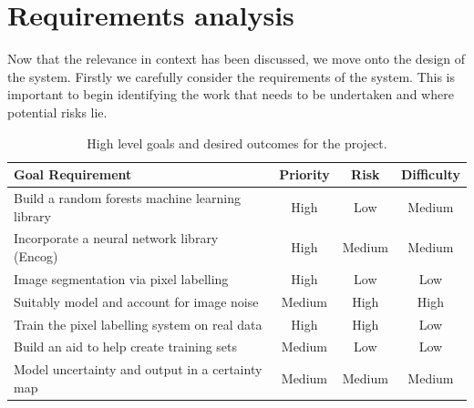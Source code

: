 \documentclass[12pt,twoside,notitlepage]{report}
\begin{document}
        








    \section{Requirements analysis}
        Now that the relevance in context has been discussed, we move onto the design of the system. Firstly we carefully consider 
        the requirements of the system. This is important to begin identifying the work that needs to be undertaken 
        and where potential risks lie. 

        \begin{table}[H]
            \begin{minipage}{\textwidth}
                \begin{tabular}{lccc}
                    \hline 
                        \textbf{Goal Requirement} & \textbf{Priority} & \textbf{Risk} & \textbf{Difficulty} \\
                    \hline 
                        Build a random forests machine learning library       & High      & Low         & Medium    \\
                        Incorporate a neural network library (Encog)          & High      & Medium      & Medium    \\
                        Image segmentation via pixel labelling                & High      & Low         & Low       \\
                        Suitably model and account for image noise            & Medium    & High        & High      \\ 
                        Train the pixel labelling system on real data         & High      & High        & Low       \\
                        Build an aid to help create training sets             & Medium    & Low         & Low       \\
                        Model uncertainty and output in a certainty map       & Medium    & Medium      & Medium    \\
                    \hline  
                \end{tabular}
            \end{minipage}
            \caption{High level goals and desired outcomes for the project.}
        \end{table}
\end{document}
